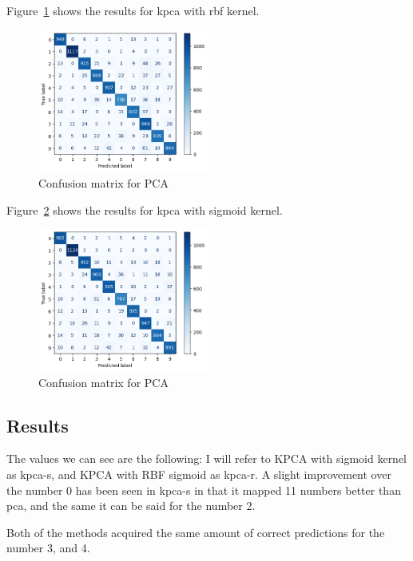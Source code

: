 Figure~\ref{fig:confusion-matrix-kernel-pca-svm-rbf} shows the results for \gls{kpca} with rbf kernel.
\begin{figure}[htb!]
\centering
\includegraphics[width=0.5\textwidth]{../src/results/experiment_three/kernel_pca_rbf_kernel_49.png}
\caption{Confusion matrix for PCA}
\label{fig:confusion-matrix-kernel-pca-svm-rbf}
\end{figure}

Figure~\ref{fig:confusion-matrix-kernel-pca-svm-sigmoid} shows the results for \gls{kpca} with sigmoid kernel.
\begin{figure}[htb!]
\centering
\includegraphics[width=0.5\textwidth]{../src/results/experiment_three/confusion_matrix_kernel_pca_svm_sigmoid.png}
\caption{Confusion matrix for PCA}
\label{fig:confusion-matrix-kernel-pca-svm-sigmoid}
\end{figure}

\subsection{Results}
The values we can see are the following: I will refer to KPCA with sigmoid kernel as \gls{kpca-s}, and KPCA with RBF sigmoid as \gls{kpca-r}. A slight improvement over the number 0 has been seen in \gls{kpca-s} in that it mapped 11 numbers better than \gls{pca}, and the same it can be said for the number 2.

Both of the methods acquired the same amount of correct predictions for the number 3, and 4.

